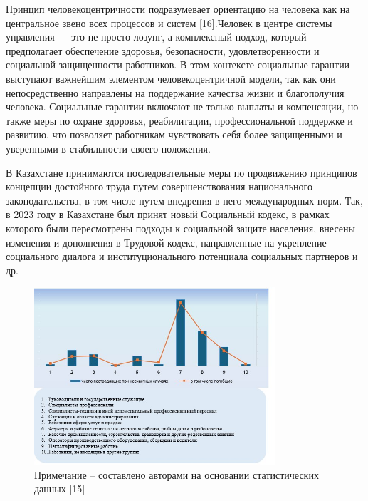 \begin{multicols}{2}
Принцип человекоцентричности подразумевает ориентацию на человека как на
центральное звено всех процессов и систем {[}16{]}.Человек в центре
системы управления --- это не просто лозунг, а комплексный подход,
который предполагает обеспечение здоровья, безопасности,
удовлетворенности и социальной защищенности работников. В этом контексте
социальные гарантии выступают важнейшим элементом человекоцентричной
модели, так как они непосредственно направлены на поддержание качества
жизни и благополучия человека. Социальные гарантии включают не только
выплаты и компенсации, но также меры по охране здоровья, реабилитации,
профессиональной поддержке и развитию, что позволяет работникам
чувствовать себя более защищенными и уверенными в стабильности своего
положения.

В Казахстане принимаются последовательные меры по продвижению принципов
концепции достойного труда путем совершенствования национального
законодательства, в том числе путем внедрения в него международных норм.
Так, в 2023 году в Казахстане был принят новый Социальный кодекс, в
рамках которого были пересмотрены подходы к социальной защите населения,
внесены изменения и дополнения в Трудовой кодекс, направленные на
укрепление социального диалога и институционального потенциала
социальных партнеров и др.

\end{multicols}


\begin{figure}[H]
	\centering
	\includegraphics[width=0.8\textwidth]{media/ekon/image5.2}
	\caption*{Рис. 2 - Анализ числа пострадавших и погибших при НСТ по роду
  деятельности (в среднем за 2019--2023 гг.), чел.}
  \caption*{Примечание -- составлено авторами на основании статистических
  данных {[}15{]}}
\end{figure}

